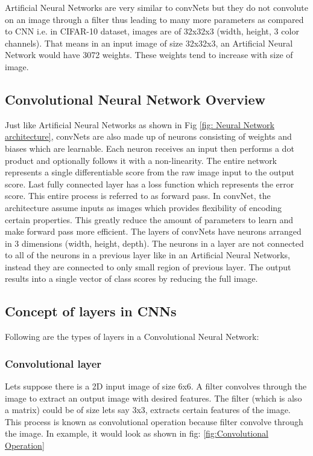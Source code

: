 \documentclass[11pt]{article}
\begin{document}
Artificial Neural Networks are very similar to convNets but they do not convolute on an image through a filter thus leading to many more parameters as compared to CNN i.e. in CIFAR-10 dataset, images are of 32x32x3 (width, height, 3 color channels). That means in an input image of size 32x32x3, an Artificial Neural Network would have 3072 weights. These weights tend to increase with size of image.

\subsection{Convolutional Neural Network Overview}
Just like Artificial Neural Networks as shown in Fig \ref{fig: Neural Network architecture}, convNets are also made up of neurons consisting of weights and biases which are learnable. Each neuron receives an input then performs a dot product and optionally follows it with a non-linearity. The entire network represents a single differentiable score from the raw image input to the output score. Last fully connected layer has a loss function which represents the error score. This entire process is referred to as forward pass. In convNet, the architecture assume inputs as images which provides flexibility of encoding certain properties. This greatly reduce the amount of parameters to learn and make forward pass more efficient. The layers of convNets have neurons arranged in 3 dimensions (width, height, depth). The neurons in a layer are not connected to all of the neurons in a previous layer like in an Artificial Neural Networks, instead they are connected to only small region of previous layer. The output results into a single vector of class scores by reducing the full image.

\subsection{Concept of layers in CNNs}
Following are the types of layers in a Convolutional Neural Network:

\subsubsection{Convolutional layer}
Lets suppose there is a 2D input image of size 6x6. A filter convolves through the image to extract an output image with desired features. The filter (which is also a matrix) could be of size lets say 3x3, extracts certain features of the image. This process is known as convolutional operation because filter convolve through the image. In example, it would look as shown in fig: \ref{fig:Convolutional Operation}
\end{document}
